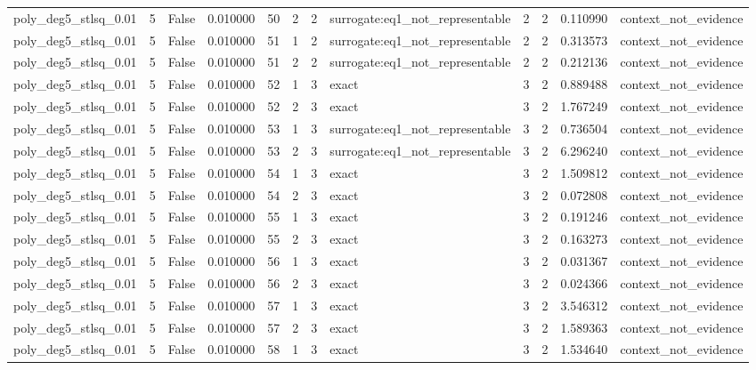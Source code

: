 \begin{tabular}{lrrrrrrlrrrl}
poly\_deg5\_stlsq\_0.01 & 5 & False & 0.010000 & 50 & 2 & 2 & surrogate:eq1\_not\_representable & 2 & 2 & 0.110990 & context\_not\_evidence \\
poly\_deg5\_stlsq\_0.01 & 5 & False & 0.010000 & 51 & 1 & 2 & surrogate:eq1\_not\_representable & 2 & 2 & 0.313573 & context\_not\_evidence \\
poly\_deg5\_stlsq\_0.01 & 5 & False & 0.010000 & 51 & 2 & 2 & surrogate:eq1\_not\_representable & 2 & 2 & 0.212136 & context\_not\_evidence \\
poly\_deg5\_stlsq\_0.01 & 5 & False & 0.010000 & 52 & 1 & 3 & exact & 3 & 2 & 0.889488 & context\_not\_evidence \\
poly\_deg5\_stlsq\_0.01 & 5 & False & 0.010000 & 52 & 2 & 3 & exact & 3 & 2 & 1.767249 & context\_not\_evidence \\
poly\_deg5\_stlsq\_0.01 & 5 & False & 0.010000 & 53 & 1 & 3 & surrogate:eq1\_not\_representable & 3 & 2 & 0.736504 & context\_not\_evidence \\
poly\_deg5\_stlsq\_0.01 & 5 & False & 0.010000 & 53 & 2 & 3 & surrogate:eq1\_not\_representable & 3 & 2 & 6.296240 & context\_not\_evidence \\
poly\_deg5\_stlsq\_0.01 & 5 & False & 0.010000 & 54 & 1 & 3 & exact & 3 & 2 & 1.509812 & context\_not\_evidence \\
poly\_deg5\_stlsq\_0.01 & 5 & False & 0.010000 & 54 & 2 & 3 & exact & 3 & 2 & 0.072808 & context\_not\_evidence \\
poly\_deg5\_stlsq\_0.01 & 5 & False & 0.010000 & 55 & 1 & 3 & exact & 3 & 2 & 0.191246 & context\_not\_evidence \\
poly\_deg5\_stlsq\_0.01 & 5 & False & 0.010000 & 55 & 2 & 3 & exact & 3 & 2 & 0.163273 & context\_not\_evidence \\
poly\_deg5\_stlsq\_0.01 & 5 & False & 0.010000 & 56 & 1 & 3 & exact & 3 & 2 & 0.031367 & context\_not\_evidence \\
poly\_deg5\_stlsq\_0.01 & 5 & False & 0.010000 & 56 & 2 & 3 & exact & 3 & 2 & 0.024366 & context\_not\_evidence \\
poly\_deg5\_stlsq\_0.01 & 5 & False & 0.010000 & 57 & 1 & 3 & exact & 3 & 2 & 3.546312 & context\_not\_evidence \\
poly\_deg5\_stlsq\_0.01 & 5 & False & 0.010000 & 57 & 2 & 3 & exact & 3 & 2 & 1.589363 & context\_not\_evidence \\
poly\_deg5\_stlsq\_0.01 & 5 & False & 0.010000 & 58 & 1 & 3 & exact & 3 & 2 & 1.534640 & context\_not\_evidence \\

\end{tabular}
